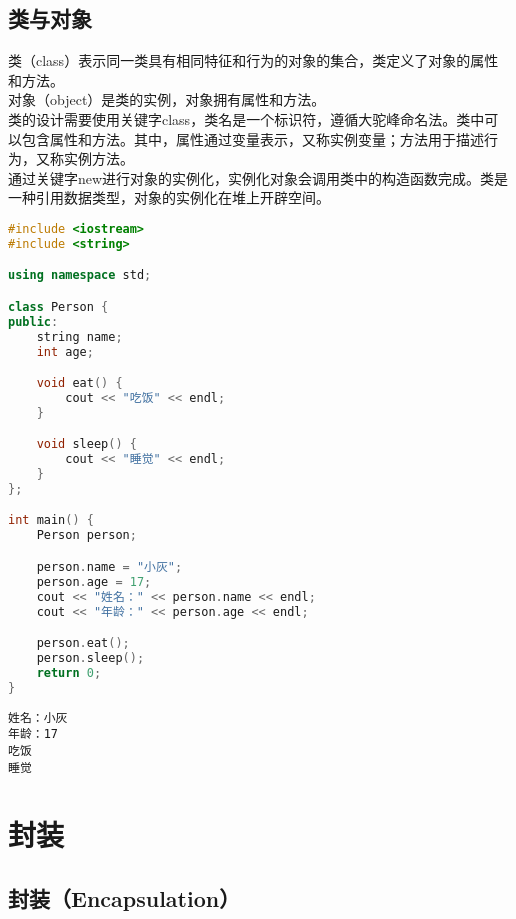 \subsection{类与对象}

类（class）表示同一类具有相同特征和行为的对象的集合，类定义了对象的属性和方法。 \\

对象（object）是类的实例，对象拥有属性和方法。 \\

类的设计需要使用关键字class，类名是一个标识符，遵循大驼峰命名法。类中可以包含属性和方法。其中，属性通过变量表示，又称实例变量；方法用于描述行为，又称实例方法。 \\

通过关键字new进行对象的实例化，实例化对象会调用类中的构造函数完成。类是一种引用数据类型，对象的实例化在堆上开辟空间。 \\


\begin{lstlisting}[language=C++]
#include <iostream>
#include <string>

using namespace std;

class Person {
public:
    string name;
    int age;

    void eat() {
        cout << "吃饭" << endl;
    }

    void sleep() {
        cout << "睡觉" << endl;
    }
};

int main() {
    Person person;

    person.name = "小灰";
    person.age = 17;
    cout << "姓名：" << person.name << endl;
    cout << "年龄：" << person.age << endl;

    person.eat();
    person.sleep();
    return 0;
}
\end{lstlisting}

\begin{tcolorbox}
	\begin{verbatim}
姓名：小灰
年龄：17
吃饭
睡觉
	\end{verbatim}
\end{tcolorbox}

\newpage

\section{封装}

\subsection{封装（Encapsulation）}

